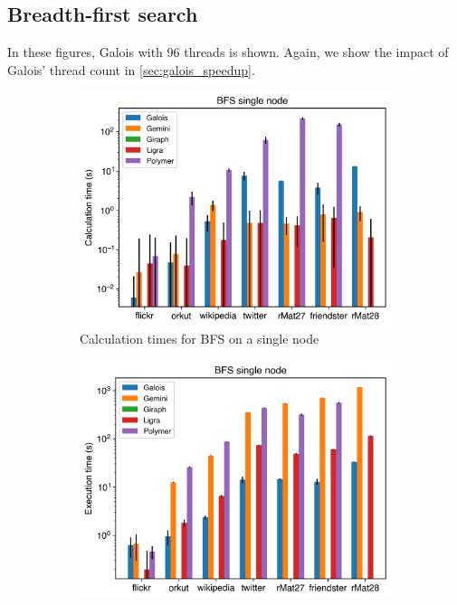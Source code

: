 \subsection{Breadth-first search}
In these figures, Galois with 96 threads is shown. Again, we show the impact of Galois' thread count in \autoref{sec:galois_speedup}.
\begin{figure}
	\begin{subfigure}{0.3\textwidth}
		\includegraphics[width=\linewidth]{../../plots/singleNodeBFS_calcTime.png}
		\caption{Calculation times for BFS on a single node}
		\label{fig:singleNodeBFS_calc}
	\end{subfigure}
	\hfil
	\begin{subfigure}{0.3\textwidth}
		\includegraphics[width=\linewidth]{../../plots/singleNodeBFS_execTime.png}

\end{subfigure}
\end{figure}
